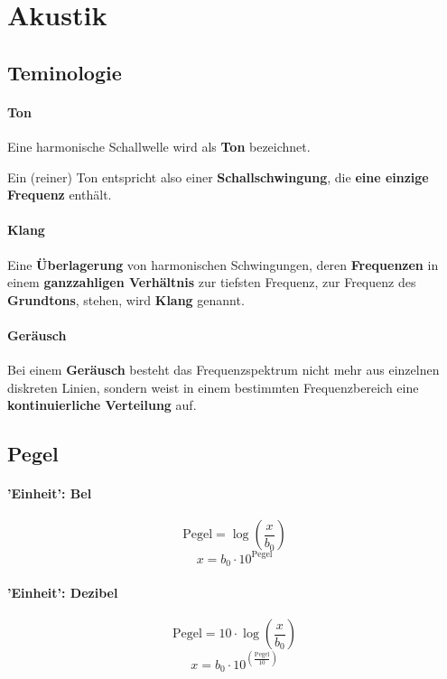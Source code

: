 \section{Akustik}

\subsection{Teminologie}

\paragraph{Ton}

Eine harmonische Schallwelle wird als \textbf{Ton} bezeichnet.

Ein (reiner) Ton entspricht also einer \textbf{Schallschwingung}, die \textbf{eine einzige Frequenz} enthält.

\medskip
\paragraph{Klang}

Eine \textbf{Überlagerung} von harmonischen Schwingungen, deren \textbf{Frequenzen} in einem 
\textbf{ganzzahligen Verhältnis} zur tiefsten Frequenz, zur Frequenz des \textbf{Grundtons}, stehen, wird \textbf{Klang} genannt. 

\medskip
\paragraph{Geräusch}

Bei einem \textbf{Geräusch} besteht das Frequenzspektrum nicht mehr aus einzelnen diskreten Linien, sondern weist in einem bestimmten Frequenzbereich eine  \textbf{kontinuierliche Verteilung} auf.


\subsection{Pegel}

\begin{minipage}[t]{0.48\columnwidth}
    \paragraph{'Einheit': Bel}

    $$ \boxed{ \text{Pegel} = \log \left( \frac{x}{b_0} \right) } $$
    $$ \boxed{ x = b_0 \cdot 10^{\text{Pegel} } } $$ 
\end{minipage}
\hfill
\begin{minipage}[t]{0.48\columnwidth}
    \paragraph{'Einheit': Dezibel}

    $$ \boxed{ \text{Pegel} = 10 \cdot \log \left( \frac{x}{b_0} \right) } $$ 
    $$ \boxed{ x = b_0 \cdot 10^{\left( \frac{\text{Pegel}}{10} \right) } } $$
\end{minipage}

